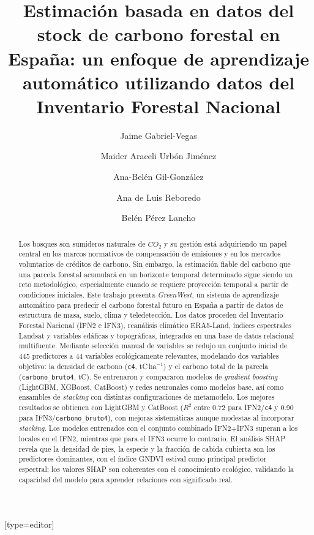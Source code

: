 \documentclass[a4paper,fleqn]{cas-dc}
\numberwithin{equation}{section}
\numberwithin{figure}{section}
\numberwithin{table}{section}
\begin{document}

\title [mode = title]{Estimación basada en datos del stock de carbono forestal en España: un enfoque de aprendizaje automático utilizando datos del Inventario Forestal Nacional}

\author[1]{Jaime Gabriel-Vegas}[type=editor]

\author[1]{Maider Araceli Urbón Jiménez}

\author[1]{Ana-Belén Gil-González}
\cormark[1]

\author[1]{Ana de Luis Reboredo}

\author[1]{Belén Pérez Lancho}



\begin{abstract}
Los bosques son sumideros naturales de \(CO_2\) y su gestión está adquiriendo un papel central en los marcos normativos de compensación de emisiones y en los mercados voluntarios de créditos de carbono. Sin embargo, la estimación fiable del carbono que una parcela forestal acumulará en un horizonte temporal determinado sigue siendo un reto metodológico, especialmente cuando se requiere proyección temporal a partir de condiciones iniciales. Este trabajo presenta \textit{GreenWest}, un sistema de aprendizaje automático para predecir el carbono forestal futuro en España a partir de datos de estructura de masa, suelo, clima y teledetección. Los datos proceden del Inventario Forestal Nacional (IFN2 e IFN3), reanálisis climático ERA5-Land, índices espectrales Landsat y variables edáficas y topográficas, integrados en una base de datos relacional multifuente. Mediante selección manual de variables se redujo un conjunto inicial de 445 predictores a 44 variables ecológicamente relevantes, modelando dos variables objetivo: la densidad de carbono (\texttt{c4}, tC\,ha$^{-1}$) y el carbono total de la parcela (\texttt{carbono\_bruto4}, tC). Se entrenaron y compararon modelos de \textit{gradient boosting} (LightGBM, XGBoost, CatBoost) y redes neuronales como modelos base, así como ensambles de \textit{stacking} con distintas configuraciones de metamodelo. Los mejores resultados se obtienen con LightGBM y CatBoost ($R^2$ entre 0.72 para IFN2/\texttt{c4} y 0.90 para IFN3/\texttt{carbono\_bruto4}), con mejoras sistemáticas aunque modestas al incorporar \textit{stacking}. Los modelos entrenados con el conjunto combinado IFN2$+$IFN3 superan a los locales en el IFN2, mientras que para el IFN3 ocurre lo contrario. El análisis SHAP revela que la densidad de pies, la especie y la fracción de cabida cubierta son los predictores dominantes, con el índice GNDVI estival como principal predictor espectral; los valores SHAP son coherentes con el conocimiento ecológico, validando la capacidad del modelo para aprender relaciones con significado real.
\end{abstract}
\end{document}
